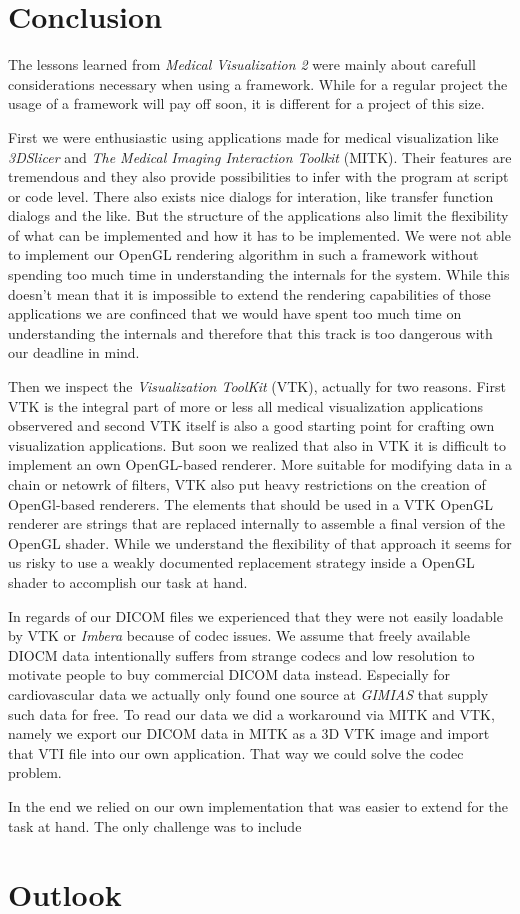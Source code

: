 \section{Conclusion}

The lessons learned from \emph{Medical Visualization 2} were mainly about carefull considerations necessary when using a framework.
While for a regular project the usage of a framework will pay off soon, it is different for a project of this size.

First we were enthusiastic using applications made for medical visualization like \emph{3DSlicer} and \emph{The Medical Imaging Interaction Toolkit} (MITK). Their features are tremendous and they also provide possibilities to infer with the program at script or code level. There also exists nice dialogs for interation, like transfer function dialogs and the like.
But the structure of the applications also limit the flexibility of what can be implemented and how it has to be implemented.
We were not able to implement our OpenGL rendering algorithm in such a framework without spending too much time in understanding the internals for the system. While this doesn't mean that it is impossible to extend the rendering capabilities of those applications we are confinced that we would have spent too much time on understanding the internals and therefore that this track is too dangerous with our deadline in mind. 

Then we inspect the \emph{Visualization ToolKit} (VTK), actually for two reasons. First VTK is the integral part of more or less all medical visualization applications observered and second VTK itself is also a good starting point for crafting own visualization applications.
But soon we realized that also in VTK it is difficult to implement an own OpenGL-based renderer. More suitable for modifying data in a chain or netowrk of filters, VTK also put heavy restrictions on the creation of OpenGl-based renderers. The elements that should be used in a VTK OpenGL renderer are strings that are replaced internally to assemble a final version of the OpenGL shader. While we understand the flexibility of that approach it seems for us risky to use a weakly documented replacement strategy inside a OpenGL shader to accomplish our task at hand.  

In regards of our DICOM files we experienced that they were not easily loadable by VTK or \emph{Imbera} because of codec issues. We assume that freely available DIOCM data intentionally suffers from strange codecs and low resolution to motivate people to buy commercial DICOM data instead.
Especially for cardiovascular data we actually only found one source at \emph{GIMIAS} that supply such data for free.
To read our data we did a workaround via MITK and VTK, namely we export our DICOM data in MITK as a 3D VTK image and import that VTI file into our own application. That way we could solve the codec problem.


In the end we relied on our own implementation that was easier to extend for the task at hand. The only challenge was to include 



\section{Outlook}

